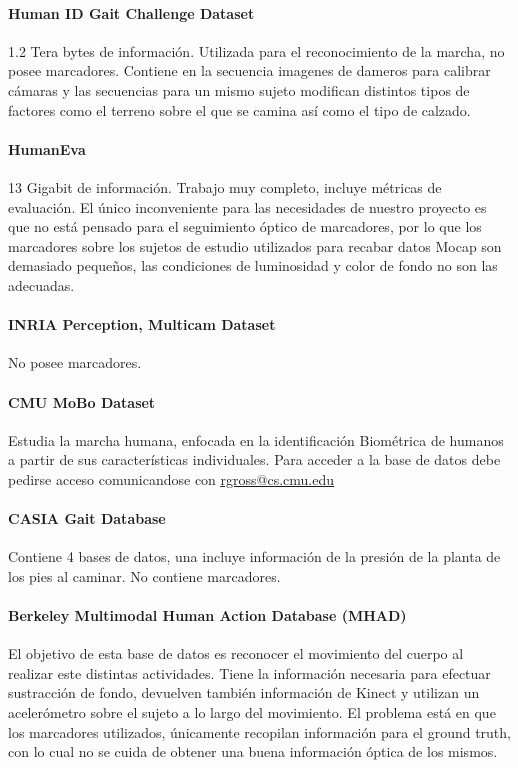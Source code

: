 \paragraph{Human ID Gait Challenge Dataset}
1.2 Tera bytes de información. Utilizada para el reconocimiento de la marcha,  no posee marcadores. Contiene en la secuencia imagenes de dameros para calibrar cámaras y las secuencias para un mismo sujeto modifican distintos tipos de factores como el terreno sobre el que se camina así como el tipo de calzado.

\paragraph{HumanEva}
13 Gigabit de información. Trabajo muy completo, incluye métricas de evaluación. El único inconveniente para las necesidades de nuestro proyecto es que no está pensado para el seguimiento óptico de marcadores, por lo que los marcadores sobre los sujetos de estudio utilizados para recabar datos Mocap son demasiado pequeños, las condiciones de luminosidad y color de fondo no son las adecuadas.

\paragraph{INRIA Perception, Multicam Dataset}
No posee marcadores. 

\paragraph{CMU MoBo Dataset}
Estudia la marcha humana, enfocada en la identificación Biométrica de humanos a partir de sus características individuales. Para acceder a la base de datos debe pedirse acceso comunicandose con \textcolor{blue}{\underline{\url{rgross@cs.cmu.edu }}}

\paragraph{CASIA Gait Database} 
Contiene 4 bases de datos, una incluye información de la presión de la planta de los pies al caminar. No contiene marcadores.

\paragraph{Berkeley Multimodal Human Action Database (MHAD)}
El objetivo de esta base de datos es reconocer el movimiento del cuerpo al realizar este distintas actividades. Tiene la información necesaria para efectuar sustracción de fondo, devuelven también información de Kinect y utilizan un acelerómetro sobre el sujeto a lo largo del movimiento. El problema está en que los marcadores utilizados, únicamente recopilan información para el ground truth, con lo cual no se cuida de obtener una buena información óptica de los mismos.


